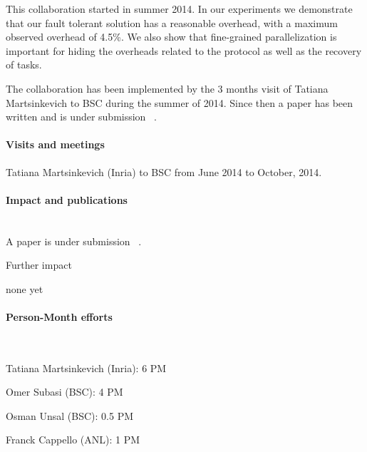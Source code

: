 \begin{refsection}
This collaboration started in summer 2014.  In our experiments we demonstrate that our fault tolerant solution has a reasonable overhead, with a maximum observed overhead of 4.5\%. We also show that fine-grained parallelization is important for hiding the overheads related to the protocol as well as the recovery of tasks.

The collaboration has been implemented by the 3 months visit of  Tatiana Martsinkevich to BSC during the summer of  2014.
Since then a paper has been written and is under submission ~\cite{Martsinkevich-Cluster2015}.  

\paragraph{Visits and meetings}

\begin{itemize*}
 \item Tatiana Martsinkevich (Inria) to BSC from June 2014 to October, 2014.
\end{itemize*}


\paragraph{Impact and publications}~\\

A paper is under submission ~\cite{Martsinkevich-Cluster2015}.  
\printbibliography[heading=none,keyword=own]

Further impact
\begin{itemize*}
    \item none yet
\end{itemize*}

\paragraph{Person-Month efforts}~\\

\begin{itemize*}
 \item Tatiana Martsinkevich (Inria): 6 PM
 \item Omer Subasi (BSC): 4 PM 
 \item Osman Unsal (BSC): 0.5 PM 
 \item Franck Cappello (ANL): 1 PM 
\end{itemize*}


\end{refsection}
